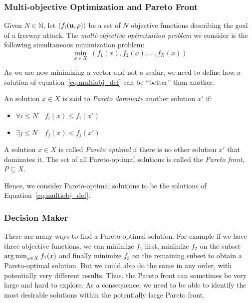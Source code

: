 		\subsubsection{Multi-objective Optimization and Pareto Front}
			\begin{definition}
			Given $N \in \mathbb{N}$, let $ ( f_i\left(\vectorize{u}, \vectorize{\rho}\right))$ be a set of $N$ objective functions describing the goal of a freeway attack. The \emph{multi-objective optimization problem} we consider is the following simultaneous minimization problem:
				\begin{equation}\label{eq:multiobj_def}
						\min_{x\in X} \; \left(f_1(x), f_2(x),\ldots, f_N(x) \right)
				\end{equation}
			\end{definition}
			As we are now minimizing a vector and not a scalar, we need to define how a solution of equation~\eqref{eq:multiobj_def} can be ``better'' than another.

			\begin{definition}\label{def:paretofront}
			An solution $x \in X$ is said to \emph{Pareto dominate} another solution $x'$ if:
				\begin{itemize}
						\item $\forall i \leq N \quad f_i(x) \leq f_i(x')$
						\item $\exists j \leq N \quad f_j(x) < f_j(x')$
				\end{itemize}
			A solution $x \in X$ is called \emph{Pareto optimal} if there is no other solution $x'$ that dominates it. The set of all Pareto-optimal solutions is called the \emph{Pareto front}, $P \subseteq X$.
			\end{definition}

			Hence, we consider Pareto-optimal solutions to be the solutions of Equation~\eqref{eq:multiobj_def}.

			\subsubsection{Decision Maker}
			There are many ways to find a Pareto-optimal solution. For example if we have three objective functions, we can minimize $f_1$ first, minimize $f_2$ on the subset $\operatorname*{arg\,min}_{x \in X} f_1(x)$ and finally minimize $f_3$ on the remaining subset to obtain a Pareto-optimal solution. But we could also do the same in any order, with potentially very different results. Thus, the Pareto front can sometimes be very large and hard to explore. As a consequence, we need to be able to identify the most desirable solutions within the potentially large Pareto front.


